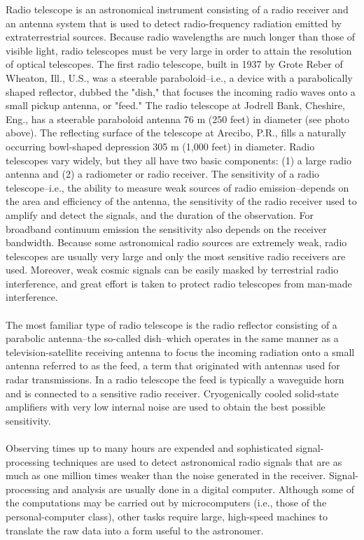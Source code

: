 \documentclass[a4paper,12pt]{report}
\begin{document}
Radio telescope is an astronomical instrument consisting of a radio receiver and an antenna system that is used to detect radio-frequency radiation emitted by extraterrestrial sources. Because radio wavelengths are much longer than those of visible light, radio telescopes must be very large in order to attain the resolution of optical telescopes. The first radio telescope, built in 1937 by Grote Reber of Wheaton, Ill., U.S., was a steerable paraboloid--i.e., a device with a parabolically shaped reflector, dubbed the "dish," that focuses the incoming radio waves onto a small pickup antenna, or "feed." The radio telescope at Jodrell Bank, Cheshire, Eng., has a steerable paraboloid antenna 76 m (250 feet) in diameter (see photo above). The reflecting surface of the telescope at Arecibo, P.R., fills a naturally occurring bowl-shaped depression 305 m (1,000 feet) in diameter. Radio telescopes vary widely, but they all have two basic components: (1) a large radio antenna and (2) a radiometer or radio receiver. The sensitivity of a radio telescope--i.e., the ability to measure weak sources of radio emission--depends on the area and efficiency of the antenna, the sensitivity of the radio receiver used to amplify and detect the signals, and the duration of the observation. For broadband continuum emission the sensitivity also depends on the receiver bandwidth. Because some astronomical radio sources are extremely weak, radio telescopes are usually very large and only the most sensitive radio receivers are used. Moreover, weak cosmic signals can be easily masked by terrestrial radio interference, and great effort is taken to protect radio telescopes from man-made interference.\\\\
The most familiar type of radio telescope is the radio reflector consisting of a parabolic antenna--the so-called dish--which operates in the same manner as a television-satellite receiving antenna to focus the incoming radiation onto a small antenna referred to as the feed, a term that originated with antennas used for radar transmissions. In a radio telescope the feed is typically a waveguide horn and is connected to a sensitive radio receiver. Cryogenically cooled solid-state amplifiers with very low internal noise are used to obtain the best possible sensitivity.\\\\
Observing times up to many hours are expended and sophisticated signal-processing techniques are used to detect astronomical radio signals that are as much as one million times weaker than the noise generated in the receiver. Signal-processing and analysis are usually done in a digital computer. Although some of the computations may be carried out by microcomputers (i.e., those of the personal-computer class), other tasks require large, high-speed machines to translate the raw data into a form useful to the astronomer.\\\\
\end{document}

